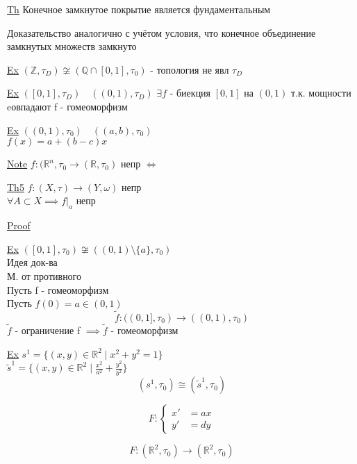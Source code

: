 \documentclass[a4paper]{article}
\begin{document}
\begin{tcolorbox}
    \underline{Th} Конечное замкнутое покрытие является фундаментальным

    Доказательство аналогично с учётом условия, что конечное объединение замкнутых
    множеств замкнуто
\end{tcolorbox}

\underline{Ex} $ (\mathbb{Z}, \tau_{D}) \not\cong (\mathbb{Q} \cap [0, 1], \tau_{0})$ 
- топология не явл $ \tau_{D} $ 

\underline{Ex} $ ([0, 1], \tau_{D}) \quad ((0,1), \tau_{D})$ $ \exists f $ - биекция
$ [0,1] $ на $ (0,1) $ т.к. мощности eовпадают f - гомеоморфизм

\underline{Ex} $ ((0,1), \tau_{0}) \quad ((a,b), \tau_{0}) $ \\
$ f(x) = a + (b - c)x $ 

\underline{Note} $ f: (\mathbb{R}^{n}, \tau_{0} \to (\mathbb{R}, \tau_{0}) $ непр
$ \iff $ 

\begin{tcolorbox}
    \underline{Th5} $ f:  (X, \tau)\to (Y, \omega)  $ непр \\
    $ \forall A \subset X \implies f|_{a} $ непр

    \underline{Proof}
\end{tcolorbox}

\underline{Ex} $ ([0,1], \tau_{0}) \not\cong ((0,1) \setminus \{ a \}, \tau_{0}) $ \\

Идея док-ва\\
М. от противного \\
Пусть f - гомеоморфизм \\
Пусть $ f(0) = a \in (0, 1) $
\[
    \tilde{f}: ((0,1], \tau_{0}) \to ((0,1), \tau_{0})
\]
$ \tilde{f} $ - ограничение f $ \implies \tilde{f} $ - гомеоморфизм

\underline{Ex} $ s^{1} = \{ (x,y) \in \mathbb{R}^2 \; | \; x^2 + y^2 = 1 \}  $ \\
$ \tilde{s}^{1} = \{ (x,y) \in \mathbb{R}^2 \; | \; \frac{x^2}{a^2}  + \frac{y^2}{b^2}  \} $\\
\[
    (s^{1}, \tau_{0}) \cong (\tilde{s}^{1}, \tau_{0})
\]

\[
    F: \begin{cases}
        x' &= ax \\
        y' &= dy
    \end{cases}
\]

\[
    F: (\mathbb{R}^2, \tau_{0}) \to (\mathbb{R}^2, \tau_{0})
\]
\end{document}

